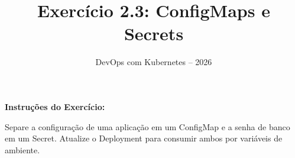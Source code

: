 \documentclass[11pt,a4paper]{article}
\title{\color{secondary}\Huge\textbf{Exercício 2.3: ConfigMaps e Secrets}}
\author{\color{primary}DevOps com Kubernetes -- 2026}
\date{}
\begin{document}
\maketitle


\textbf{Instruções do Exercício:}

\begin{tcolorbox}[colback=blue!5!white,colframe=blue!75!black]
Separe a configuração de uma aplicação em um ConfigMap e a senha de banco em um Secret. Atualize o Deployment para consumir ambos por variáveis de ambiente.
\end{tcolorbox}
\end{document}
